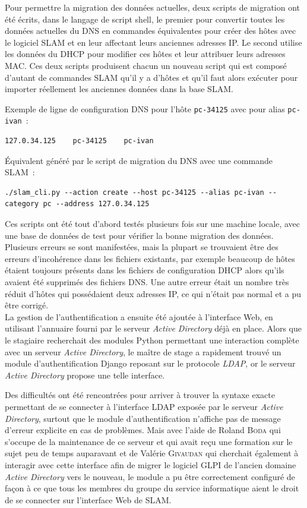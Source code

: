 \documentclass[12pt,a4paper,twoside]{report}
\begin{document}
Pour permettre la migration des données actuelles, deux scripts de migration
ont été écrits, dans le langage de script shell, le premier pour convertir
toutes les données actuelles du DNS en commandes équivalentes pour créer des
hôtes avec le logiciel SLAM et en leur affectant leurs anciennes adresses IP.
Le second utilise les données du DHCP pour modifier ces hôtes et leur attribuer
leurs adresses MAC. Ces deux scripts produisent chacun un nouveau script qui
est composé d’autant de commandes SLAM qu’il y a d’hôtes et qu’il faut alors
exécuter pour importer réellement les anciennes données dans la base SLAM.

Exemple de ligne de configuration DNS pour l’hôte \verb+pc-34125+ avec pour
alias \verb+pc-ivan+~:
\begin{lstlisting}
127.0.34.125	pc-34125	pc-ivan
\end{lstlisting}

Équivalent généré par le script de migration du DNS avec une commande SLAM~:
\begin{lstlisting}
./slam_cli.py --action create --host pc-34125 --alias pc-ivan --category pc --address 127.0.34.125
\end{lstlisting}

Ces scripts ont été tout d’abord testés plusieurs fois sur une machine locale,
avec une base de données de test pour vérifier la bonne migration des données.
Plusieurs erreurs se sont manifestées, mais la plupart se trouvaient être des
erreurs d’incohérence dans les fichiers existants, par exemple beaucoup de
hôtes étaient toujours présents dans les fichiers de configuration DHCP alors
qu’ils avaient été supprimés des fichiers DNS. Une autre erreur était un nombre
très réduit d’hôtes qui possédaient deux adresses IP, ce qui n’était pas
normal et a pu être corrigé.\\

La gestion de l’authentification a ensuite été ajoutée à l’interface Web, en
utilisant l’annuaire fourni par le serveur \emph{Active Directory} déjà en
place. Alors que le stagiaire recherchait des modules Python permettant une
interaction complète avec un serveur \emph{Active Directory}, le maître de
stage a rapidement trouvé un module d’authentification Django reposant sur le
protocole \emph{LDAP}, or le serveur \emph{Active Directory} propose une telle
interface.

Des difficultés ont été rencontrées pour arriver à trouver la syntaxe exacte
permettant de se connecter à l’interface LDAP exposée par le serveur
\emph{Active Directory}, surtout que le module d’authentification n’affiche pas
de message d’erreur explicite en cas de problèmes. Mais avec l’aide de Roland
\textsc{Boda} qui s’occupe de la maintenance de ce serveur et qui avait reçu
une formation sur le sujet peu de temps auparavant et de Valérie
\textsc{Givaudan} qui cherchait également à interagir avec cette interface afin
de migrer le logiciel GLPI de l’ancien domaine \emph{Active Directory} vers le
nouveau, le module a pu être correctement configuré de façon à ce que tous les
membres du groupe du service informatique aient le droit de se connecter sur
l’interface Web de SLAM.\\
\end{document}
